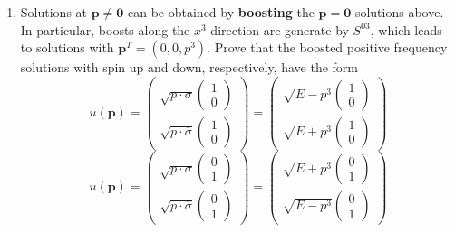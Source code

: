 \documentclass[12pt]{article}
\begin{document}
\begin{enumerate}[label=(\alph*), start = 3]
    \item Solutions at $\mathbf{p}\neq\mathbf{0}$ can be obtained by \textbf{boosting} the $\mathbf{p} = \mathbf{0}$ solutions above. In particular, boosts along the $x^3$ direction are generate by $S^{03}$, which leads to solutions with $\mathbf{p}^T = (0,0,p^3)$. Prove that the boosted positive frequency solutions with spin up and down, respectively, have the form 
        \[
            u(\mathbf{p}) = 
            \begin{pmatrix}
                \sqrt{p\cdot \sigma}\begin{pmatrix}1 \\ 0\end{pmatrix} \\
                \sqrt{p\cdot \overline{\sigma}}\begin{pmatrix}1 \\ 0\end{pmatrix}
            \end{pmatrix} = 
            \begin{pmatrix}
                \sqrt{E-p^3}\begin{pmatrix}1 \\ 0\end{pmatrix} \\
                \sqrt{E+p^3}\begin{pmatrix}1 \\ 0\end{pmatrix}
            \end{pmatrix}
        \]
        \[
            u(\mathbf{p}) = 
                \begin{pmatrix}
                    \sqrt{p\cdot \sigma}\begin{pmatrix}0 \\ 1\end{pmatrix} \\
                    \sqrt{p\cdot \overline{\sigma}}\begin{pmatrix}0 \\ 1\end{pmatrix}
                \end{pmatrix} = 
                \begin{pmatrix}
                    \sqrt{E+p^3}\begin{pmatrix}0 \\ 1\end{pmatrix} \\
                    \sqrt{E-p^3}\begin{pmatrix}0 \\ 1\end{pmatrix}
                \end{pmatrix}
        \]
\end{enumerate}
\end{document}

